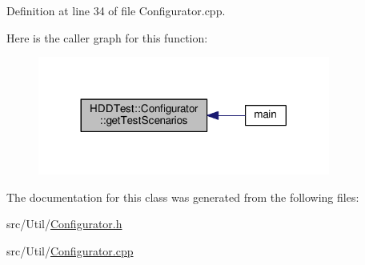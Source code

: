 Definition at line 34 of file Configurator.\-cpp.



Here is the caller graph for this function\-:
\nopagebreak
\begin{figure}[H]
\begin{center}
\leavevmode
\includegraphics[width=272pt]{class_h_d_d_test_1_1_configurator_a77eb045da43a5c8ffde204f8e86e9e9e_icgraph}
\end{center}
\end{figure}




The documentation for this class was generated from the following files\-:\begin{DoxyCompactItemize}
\item 
src/\-Util/\hyperlink{_configurator_8h}{Configurator.\-h}\item 
src/\-Util/\hyperlink{_configurator_8cpp}{Configurator.\-cpp}\end{DoxyCompactItemize}
